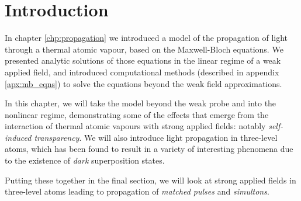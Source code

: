 \section{Introduction}
  \label{sec:nonlinear_intro}

  In chapter \ref{chp:propagation} we introduced a model of the propagation of
  light through a thermal atomic vapour, based on the Maxwell-Bloch equations.
  We presented analytic solutions of those equations in the linear regime of a
  weak applied field, and introduced computational methods (described in
  appendix \ref{apx:mb_eqns}) to solve the equations beyond the weak field
  approximations.

  In this chapter, we will take the model beyond the weak probe and into the
  nonlinear regime, demonstrating some of the effects that emerge from the
  interaction of thermal atomic vapours with strong applied fields: notably
  \textit{self-induced transparency}. We will also introduce light propagation
  in three-level atoms, which has been found to result in a variety of
  interesting phenomena due to the existence of \textit{dark} superposition
  states. 

  Putting these together in the final section, we will look at strong
  applied fields in three-level atoms leading to propagation of \textit{matched pulses} and \textit{simultons}.

  \newpage